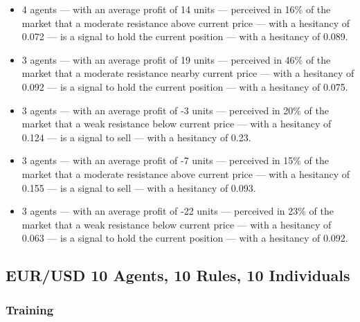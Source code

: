 {\small
  \begin{itemize}
  \item 4 agents — with an average profit of 14 units — perceived in 16\% of the
    market that a moderate resistance above current price — with a hesitancy of
    0.072 — is a signal to hold the current position — with a hesitancy of
    0.089.
  \item 3 agents — with an average profit of 19 units — perceived in 46\% of the
    market that a moderate resistance nearby current price — with a hesitancy of
    0.092 — is a signal to hold the current position — with a hesitancy of
    0.075.
  \item 3 agents — with an average profit of -3 units — perceived in 20\% of the
    market that a weak resistance below current price — with a hesitancy of
    0.124 — is a signal to sell — with a hesitancy of 0.23.
  \item 3 agents — with an average profit of -7 units — perceived in 15\% of the
    market that a moderate resistance above current price — with a hesitancy of
    0.155 — is a signal to sell — with a hesitancy of 0.093.
  \item 3 agents — with an average profit of -22 units — perceived in 23\% of
    the market that a weak resistance below current price — with a hesitancy of
    0.063 — is a signal to hold the current position — with a hesitancy of
    0.092.
  \end{itemize}
}

\subsection{EUR/USD 10 Agents, 10 Rules, 10 Individuals}
\label{results:interpretation-eur-usd-10agents-10rules-10individuals}

\subsubsection{Training}

